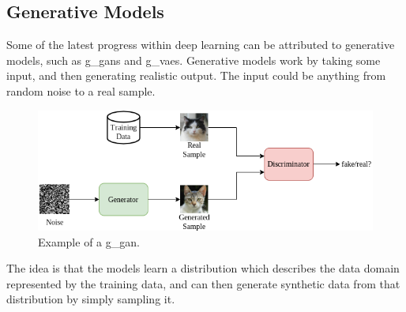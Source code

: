\subsection{Generative Models}
Some of the latest progress within deep learning can be attributed to generative models, such as \glspl*{g_gan}\cite{gan} and \glspl*{g_vae}\cite{vae}. Generative models work by taking some input, and then generating realistic output. The input could be anything from random noise to a real sample.
\begin{figure}[H]
    \centering
    \includegraphics[width=\linewidth]{resources/related_works/gan.png}
    \caption{Example of a \gls*{g_gan}.}
\end{figure}
The idea is that the models learn a distribution which describes the data domain represented by the training data, and can then generate synthetic data from that distribution by simply sampling it.
